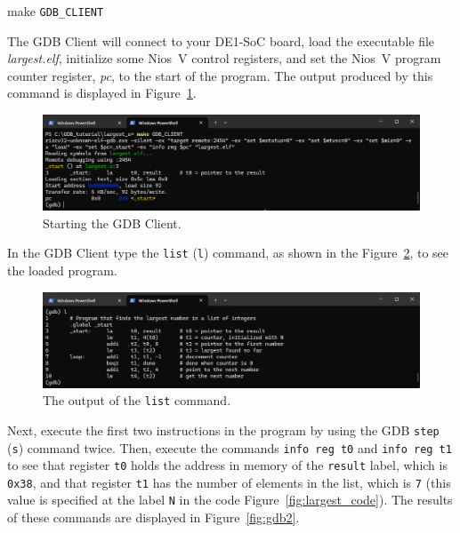 \documentclass[11pt, twoside, pdftex]{article}
\begin{document}
{make \texttt{GDB\_CLIENT}

The GDB Client will connect to your DE1-SoC board, load the executable file {\it largest.elf},
initialize some Nios~V control registers, and set the Nios~V program counter register, {\it pc},
to the start of the program. The output produced by this command is displayed in 
Figure~\ref{fig:gdb_client}.

\begin{figure}[h]
    \begin{center}
        \includegraphics[scale=.6]{figures/gdb_client.png}
        \caption{Starting the GDB Client.}
        \label{fig:gdb_client}
    \end{center}
\end{figure}

In the GDB Client type the \texttt{list} (\texttt{l}) command, as shown in the 
Figure~\ref{fig:gdb1}, to see the loaded program.

\begin{figure}[h]
    \begin{center}
        \includegraphics[scale=.6]{figures/gdb1.png}
        \caption{The output of the \texttt{list} command.}
        \label{fig:gdb1}
    \end{center}
\end{figure}

Next, execute the first two instructions in the program by using the 
GDB \texttt{step} (\texttt{s}) command twice. Then, execute the commands 
\texttt{info reg t0} and \texttt{info reg t1} to see that register \texttt{t0} 
holds the address in memory of the \texttt{result} label, which is \texttt{0x38}, and that
register \texttt{t1} has the number of elements in the list, which is \texttt{7} (this value is
specified at the label \texttt{N} in the code Figure~\ref{fig:largest_code}).
The results of these commands are displayed in Figure~\ref{fig:gdb2}.

}
\end{document}
